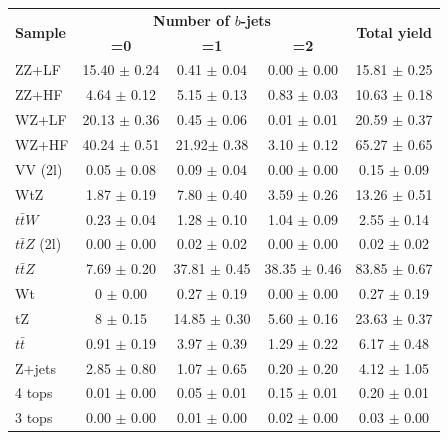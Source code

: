 \begin{table}[!h]
	\centering
	\begin{tabular}{|l|c|c|c|c|}
		\hline
		\multirow{2}{*}{\textbf{Sample}}      & \multicolumn{3}{|c|}{\textbf{Number of $b$-jets}} & \multirow{2}{*}{\textbf{Total yield}}\\
		\cline{2-4}
		& \textbf{=0}     & \textbf{=1}     & \textbf{=2}    &\\                    
		\hline   
		ZZ+LF &                 15.40 $\pm$ 0.24  & 0.41 $\pm$ 0.04   & 0.00 $\pm$ 0.00   &  15.81 $\pm$ 0.25  \\
		ZZ+HF &                 4.64  $\pm$ 0.12  & 5.15 $\pm$ 0.13   & 0.83 $\pm$ 0.03   &  10.63 $\pm$ 0.18  \\
		WZ+LF &                 20.13 $\pm$ 0.36  & 0.45 $\pm$ 0.06   & 0.01 $\pm$ 0.01   &  20.59 $\pm$ 0.37  \\
		WZ+HF &                 40.24 $\pm$ 0.51  & 21.92$\pm$ 0.38   & 3.10 $\pm$ 0.12   &  65.27 $\pm$ 0.65  \\
		VV (2l) &               0.05 $\pm$ 0.08   & 0.09 $\pm$ 0.04   & 0.00 $\pm$ 0.00   &  0.15 $\pm$ 0.09   \\
		WtZ &                   1.87 $\pm$ 0.19   & 7.80 $\pm$ 0.40   & 3.59 $\pm$ 0.26   &  13.26 $\pm$ 0.51  \\
		$t\bar{t}W$ &           0.23 $\pm$ 0.04   & 1.28 $\pm$ 0.10   & 1.04 $\pm$ 0.09   &  2.55 $\pm$ 0.14   \\
		$t\bar{t}Z$ (2l) &      0.00 $\pm$ 0.00   & 0.02 $\pm$ 0.02   & 0.00 $\pm$ 0.00   &  0.02 $\pm$ 0.02   \\
		$t\bar{t}Z$ &           7.69 $\pm$ 0.20  & 37.81 $\pm$ 0.45  & 38.35 $\pm$ 0.46   &  83.85 $\pm$ 0.67  \\
		Wt &                    0 $\pm$ 0.00      & 0.27 $\pm$ 0.19   & 0.00 $\pm$ 0.00   &  0.27 $\pm$ 0.19   \\
		tZ &                    8 $\pm$ 0.15      & 14.85 $\pm$ 0.30  & 5.60 $\pm$ 0.16   &  23.63 $\pm$ 0.37  \\
		$t\bar{t}$ &            0.91 $\pm$ 0.19   & 3.97 $\pm$ 0.39   & 1.29 $\pm$ 0.22   &  6.17 $\pm$ 0.48   \\
		Z+jets &                2.85 $\pm$ 0.80   & 1.07 $\pm$ 0.65   & 0.20 $\pm$ 0.20   &  4.12 $\pm$ 1.05   \\
		4 tops &                0.01 $\pm$ 0.00   & 0.05 $\pm$ 0.01   & 0.15 $\pm$ 0.01   &  0.20 $\pm$ 0.01   \\
		3 tops &                0.00 $\pm$ 0.00   & 0.01 $\pm$ 0.00   & 0.02 $\pm$ 0.00   &  0.03 $\pm$ 0.00   \\

\end{tabular}
\end{table}
